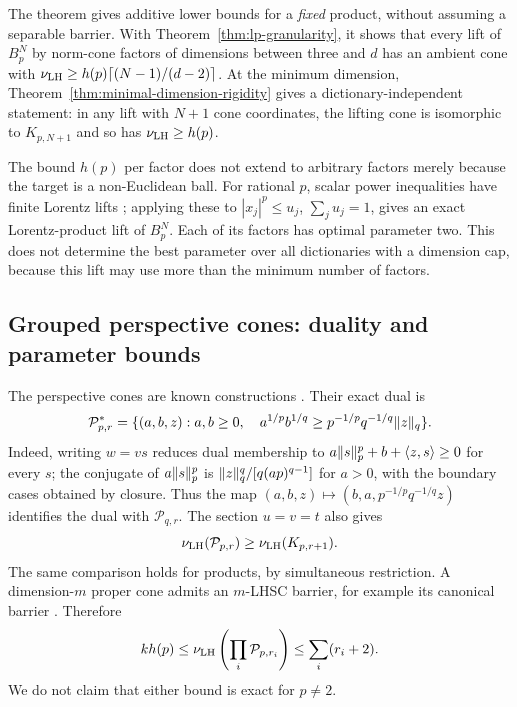 The theorem gives additive lower bounds for a \emph{fixed} product,
without assuming a separable barrier. With
Theorem~\ref{thm:lp-granularity}, it shows that every lift of $B_p^N$
by norm-cone factors of dimensions between three and $d$ has an ambient
cone with $\nu_{\rm LH}\geq h(p)\lceil(N-1)/(d-2)\rceil$.
At the minimum dimension, Theorem~\ref{thm:minimal-dimension-rigidity}
gives a dictionary-independent statement: in any lift with $N+1$ cone
coordinates, the lifting cone is isomorphic to $K_{p,N+1}$ and so has
$\nu_{\rm LH}\geq h(p)$.

The bound $h(p)$ per factor does not extend to arbitrary factors
merely because the target is a non-Euclidean ball. For rational $p$, scalar power
inequalities have finite Lorentz lifts \citep{Wang2024}; applying these
to $|x_j|^p\leq u_j$, $\sum_j u_j=1$, gives an exact Lorentz-product
lift of $B_p^N$. Each of its factors has optimal parameter two.
This does not determine the best parameter over all dictionaries with
a dimension cap, because this lift may use more than the minimum
number of factors.

\subsection{Grouped perspective cones: duality and parameter bounds}
The perspective cones are known constructions
\citep{GlineurTerlaky2004,Chares2009}. Their exact dual is
\begin{equation}\label{eq:perspective-dual}
 \mathcal P_{p,r}^*=
 \{(a,b,z):a,b\geq0,\quad
 a^{1/p}b^{1/q}\geq p^{-1/p}q^{-1/q}\lVert z\rVert_q\}.
\end{equation}
Indeed, writing $w=vs$ reduces dual membership to
$a\lVert s\rVert_p^p+b+\langle z,s\rangle\geq0$ for every $s$; the conjugate of
$a\lVert s\rVert_p^p$ is $\lVert z\rVert_q^q/[q(ap)^{q-1}]$ for $a>0$, with the
boundary cases obtained by closure. Thus the map
$(a,b,z)\mapsto(b,a,p^{-1/p}q^{-1/q}z)$ identifies the dual with
$\mathcal P_{q,r}$. The section $u=v=t$ also gives
\begin{equation}\label{eq:perspective-section-comparison}
 \nu_{\rm LH}(\mathcal P_{p,r})\geq\nu_{\rm LH}(K_{p,r+1}).
\end{equation}
The same comparison holds for products, by simultaneous restriction.
A dimension-$m$ proper cone admits an $m$-LHSC barrier, for example its
canonical barrier \citep{HildebrandCanonical2014}. Therefore
\begin{equation}\label{eq:perspective-interval}
 kh(p)\leq\nu_{\rm LH}\left(\prod_i\mathcal P_{p,r_i}\right)
 \leq\sum_i(r_i+2).
\end{equation}
We do not claim that either bound is exact for $p\ne2$.

